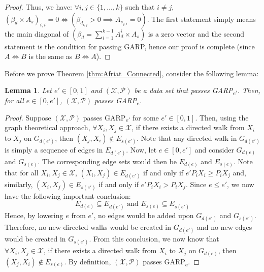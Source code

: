 \documentclass{article} %
\theoremstyle{style1}
\newtheorem{lemma}[theorem]{Lemma}
\theoremstyle{style1}
\theoremstyle{example}
\begin{document}
\begin{proof}
Thus, we have: $\forall i, j\in\{1,\ldots,k\}$ such that $i\not=j$, $(\beta_d\times A_s)_{i,i}=0 \iff (\beta_{d_{i,j}}>0 \implies A_{s_{j,i}}=0)$. The first statement simply means the main diagonal of $(\beta_d=\sum_{i=1}^{k-1}A_{d}^{i}\times A_s)$ is a zero vector and the second statement is the condition for passing GARP, hence our proof is complete (since $A\iff B$ is the same as $B\iff A$).
\end{proof}

\AfriatConnected*
Before we prove Theorem \ref{thm:Afriat_Connected}, consider the following lemma:

\begin{lemma}\label{Lemma:Connectedness}
Let $e'\in[0,1]$ and $(\mathcal{X},\mathcal{P})$ be a data set that passes GARP\textsubscript{$e'$}. Then, for all $e\in[0,e']$, $(\mathcal{X},\mathcal{P})$ passes GARP\textsubscript{$e$}.
\end{lemma}
\begin{proof}
Suppose $(\mathcal{X},\mathcal{P})$ passes GARP\textsubscript{$e'$} for some $e'\in[0,1]$. Then, using the graph theoretical approach, $\forall X_i,X_j\in\mathcal{X}$, if there exists a directed walk from $X_i$ to $X_j$ on $G_{d(e')}$, then $(X_j,X_i)\not\in E_{s(e')}$. Note that any directed walk in $G_{d(e')}$ is simply a sequence of edges in $E_{d(e')}$. Now, let $e\in[0,e']$ and consider $G_{d(e)}$ and $G_{s(e)}$. The corresponding edge sets would then be $E_{d(e)}$ and $E_{s(e)}$. Note that for all $X_i,X_j\in\mathcal{X}$, $(X_i,X_j)\in  E_{d(e')}$ if and only if $e'P_iX_i\geq P_iX_j$ and, similarly,  $(X_i,X_j)\in  E_{s(e')}$ if and only if $e'P_iX_i>P_iX_j$. Since $e\leq e'$, we now have the following important conclusion: $$E_{d(e)}\subseteq E_{d(e')}\textrm{ and }E_{s(e)}\subseteq E_{s(e')}$$ Hence, by lowering $e$ from $e'$, no edges would be added upon $G_{d(e')}$ and $G_{s(e')}$. Therefore, no new directed walks would be created in $G_{d(e')}$ and no new edges would be created in $G_{s(e')}$. From this conclusion, we now know that $\forall X_i,X_j\in\mathcal{X}$, if there exists a directed walk from $X_i$ to $X_j$ on $G_{d(e)}$, then $(X_j,X_i)\not\in E_{s(e)}$. By definition, $(\mathcal{X},\mathcal{P})$ passes GARP\textsubscript{$e$}.
\end{proof}
\end{document}
